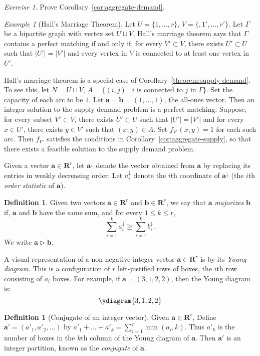 \documentclass{amsbook}
\newcommand{\bb}{\mathbf b}
\renewcommand{\aa}{\mathbf a}
\newcommand{\RR}{\mathbf R}
\theoremstyle{definition}
\newtheorem{definition}[theorem]{Definition}
\theoremstyle{remark}
\newtheorem{example}[theorem]{Example}
\newtheorem{exercise}[theorem]{Exercise}
\begin{document}
\begin{exercise}
  Prove Corollary~\ref{cor:aggregate-demand}.
\end{exercise}
\begin{example}
  [Hall's Marriage Theorem]
  Let $U=\{1,\dotsc,r\}$, $V=\{,1',\dotsc,r'\}$.
  Let $\Gamma$ be a bipartite graph with vertex set $U\sqcup V$,
  Hall's marriage theorem says that $\Gamma$ contains a perfect matching if and only if, for every $V'\subset V$, there exists $U'\subset U$ such that $|U'|=|V'|$ and every vertex in $V$ is connected to at least one vertex in $U'$.
  
  Hall's marriage theorem is a special case of Corollary~\ref{theorem:supply-demand}.
  To see this, let $N=U\sqcup V$, $A=\{(i,j)\mid \text{$i$ is connected to $j$ in $\Gamma$}\}$.
  Set the capacity of each arc to be $1$.
  Let $\aa=\bb=(1,\dotsc,1)$, the all-ones vector.
  Then an integer solution to the supply demand problem is a perfect matching.
  Suppose, for every subset $V'\subset V$, there exists $U'\subset U$ such that $|U'|= |V'|$ and for every $x\in U'$, there exists $y\in V'$ such that $(x,y)\in A$.
  Set $f_{V'}(x,y)=1$ for each such arc.
  Then $f_{V'}$ satisfies the conditions in Corollary~\ref{cor:aggregate-supply}, so that there exists a feasible solution to the supply demand problem.
\end{example}
Given a vector $\aa\in \RR^r$, let $\aa^\downarrow$ denote the vector obtained from $\aa$ by replacing its entries in weakly decreasing order.
Let $a^\downarrow_i$ denote the $i$th coordinate of $\aa^\downarrow$ (the $i$th \emph{order statistic} of $\aa$).
\begin{definition}
  \label{definition:majorization}
  Given two vectors $\aa\in \RR^r$ and $\bb\in \RR^s$, we say that $\aa$ \emph{majorizes} $\bb$ if, $\aa$ and $\bb$ have the same sum, and for every $1\leq k\leq r$,
  \begin{displaymath}
    \sum_{i=1}^k a^\downarrow_i \geq \sum_{i=1}^k b^\downarrow_i. 
  \end{displaymath}
  We write $\aa\rhd \bb$.
\end{definition}
A visual representation of a non-negative integer vector $\aa\in \RR^r$ is by its \emph{Young diagram}.
This is a configuration of $r$ left-justified rows of boxes, the $i$th row consisting of $a_i$ boxes.
For example, if $\aa=(3,1,2,2)$, then the Young diagram is:
\begin{displaymath}
  \ydiagram{3,1,2,2}
\end{displaymath}
\begin{definition}
  [Conjugate of an integer vector]
  Given $\aa\in \RR^r$, Define $\aa'=(a'_1,a'_2,\dotsc)$ by $a'_1+\dotsc + a'_k=\sum_{i=1}^r \min(a_i,k)$.
  Thus $a'_k$ is the number of boxes in the $k$th column of the Young diagram of $\aa$.
  Then $\aa'$ is an integer partition, known as the \emph{conjugate} of $\aa$.
\end{definition}
\end{document}
